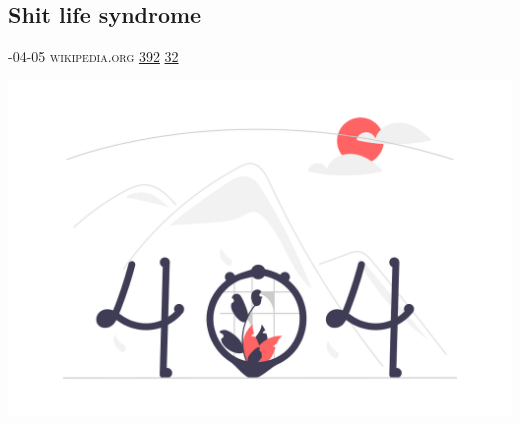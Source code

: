 \documentclass[10pt,a4paper]{article}
\begin{document}
\begin{multicols*}{2}
\begin{minipage}{\linewidth}
\subsection{Shit life syndrome}
\textsc{\footnotesize
{\scriptsize\faCalendar}-04-05 
{\scriptsize\faGlobe}\space 
wikipedia.org 
{\scriptsize\faThumbsOUp}\space 
\href{http://news.ycombinator.com/item?id=37197155\&utm\_term=comment}{392} 
{\scriptsize\faComments}\space 
\href{http://news.ycombinator.com/item?id=37197155\&utm\_term=comment}{32} 
}
\par\medskip\noindent
\href{https://en.wikipedia.org/wiki/Shit\_life\_syndrome?utm\_source=hackernewsletter\&utm\_medium=email\&utm\_term=learn}{
    \includegraphics[width=0.99\linewidth]{notfound.png}
}
\end{minipage}

\end{multicols*}
\end{document}
